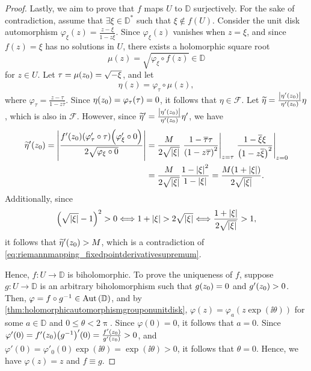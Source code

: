 \begin{proof}
    Lastly, we aim to prove that \(f\) maps \(U\) to \(\mathbb{D}\) surjectively. For the sake of contradiction, assume that \(\exists\xi\in\mathbb{D}^*\) such that \(\xi\notin f(U)\). Consider the unit disk automorphism \(\varphi_\xi(z)=\frac{z-\xi}{1-z\overline{\xi}}\). Since \(\varphi_\xi(z)\) vanishes when \(z=\xi\), and since \(f(z)=\xi\) has no solutions in \(U\), there exists a holomorphic square root \[\mu(z)=\sqrt{\varphi_\xi\circ f(z)}\in\mathbb{D}\] for \(z\in U\). Let \(\tau=\mu\qty(z_0)=\sqrt{-\xi}\), and let \[\eta(z)=\varphi_\tau\circ\mu(z),\]
    where \(\varphi_\tau=\frac{z-\tau}{1-z\overline{\tau}}\). Since \(\eta\qty(z_0)=\varphi_\tau\qty(\tau)=0\), it follows that \(\eta\in\mathcal{F}\). Let \(\widetilde{\eta}=\frac{\abs{\eta'\qty(z_0)}}{\eta'\qty(z_0)}\eta\), which is also in \(\mathcal{F}\). However, since \(\widetilde{\eta}'=\frac{\abs{\eta'\qty(z_0)}}{\eta'\qty(z_0)}\eta'\), we have
    \begin{align*}
        \widetilde{\eta}'\qty(z_0)=\abs{\frac{f'\qty(z_0)\qty(\varphi'_\tau\circ\tau)\qty(\varphi'_\xi\circ 0)}{2\sqrt{\varphi_\xi\circ 0}}} & =\frac{M}{2\sqrt{\abs{\xi}}}\eval{\frac{1-\overline{\tau}\tau}{\qty(1-z\overline{\tau})^2}}_{z=\tau}\eval{\frac{1-\overline{\xi}\xi}{\qty(1-z\overline{\xi})^2}}_{z=0} \\
        & =\frac{M}{2\sqrt{\abs{\xi}}}\frac{1-\abs{\xi}^2}{1-\abs{\xi}}=\frac{M\qty(1+\abs{\xi})}{2\sqrt{\abs{\xi}}}.
    \end{align*}
    Additionally, since
    \[\qty(\sqrt{\abs{\xi}}-1)^2>0\Longleftrightarrow 1+\abs{\xi}>2\sqrt{\abs{\xi}}\Longleftrightarrow\frac{1+\abs{\xi}}{2\sqrt{\abs{\xi}}}>1,\]
    it follows that \(\widetilde{\eta}'\qty(z_0)>M\), which is a contradiction of \cref{eq:riemannmapping_fixedpointderivativesupremum}.

    Hence, \(f:U\to\mathbb{D}\) is biholomorphic. To prove the uniqueness of \(f\), suppose \(g:U\to\mathbb{D}\) is an arbitrary biholomorphism such that \(g\qty(z_0)=0\) and \(g'\qty(z_0)>0\). Then, \(\varphi=f\circ g^{-1}\in\operatorname{Aut}\qty(\mathbb{D})\), and by \cref{thm:holomorphicautomorphismgrouponunitdisk}, \(\varphi(z)=\varphi_a(z\exp(\ii\theta))\) for some \(a\in\mathbb{D}\) and \(0\leq\theta<2\uppi\). Since \(\varphi(0)=0\), it follows that \(a=0\). Since \(\varphi'(0)=f'\qty(z_0)\qty(g^{-1})'(0)=\frac{f'\qty(z_0)}{g'(z_0)}>0\), and \(\varphi'(0)=\varphi'_0(0)\exp(\ii\theta)=\exp(\ii\theta)>0\), it follows that \(\theta=0\). Hence, we have \(\varphi(z)=z\) and \(f\equiv g\).


\end{proof}
